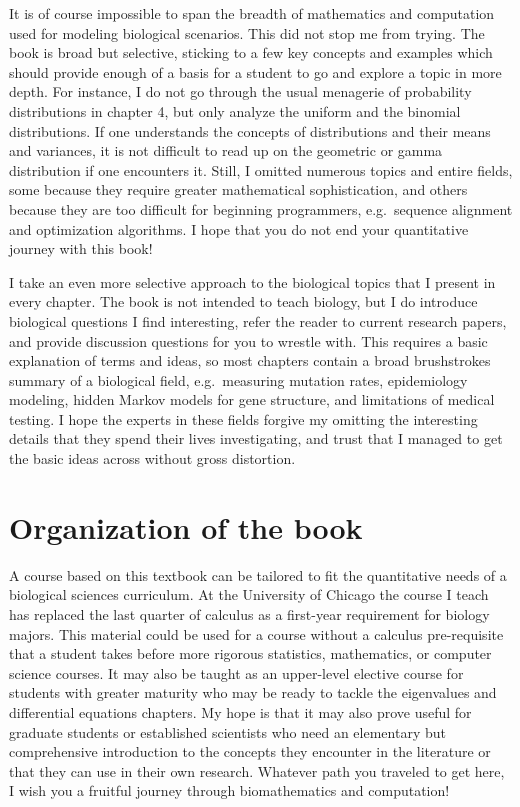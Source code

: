 \documentclass[
  letterpaper,
  DIV=11,
  numbers=noendperiod]{scrreprt}
\begin{document}
It is of course impossible to span the breadth of mathematics and
computation used for modeling biological scenarios. This did not stop me
from trying. The book is broad but selective, sticking to a few key
concepts and examples which should provide enough of a basis for a
student to go and explore a topic in more depth. For instance, I do not
go through the usual menagerie of probability distributions in chapter
4, but only analyze the uniform and the binomial distributions. If one
understands the concepts of distributions and their means and variances,
it is not difficult to read up on the geometric or gamma distribution if
one encounters it. Still, I omitted numerous topics and entire fields,
some because they require greater mathematical sophistication, and
others because they are too difficult for beginning programmers,
e.g.~sequence alignment and optimization algorithms. I hope that you do
not end your quantitative journey with this book!

I take an even more selective approach to the biological topics that I
present in every chapter. The book is not intended to teach biology, but
I do introduce biological questions I find interesting, refer the reader
to current research papers, and provide discussion questions for you to
wrestle with. This requires a basic explanation of terms and ideas, so
most chapters contain a broad brushstrokes summary of a biological
field, e.g.~measuring mutation rates, epidemiology modeling, hidden
Markov models for gene structure, and limitations of medical testing. I
hope the experts in these fields forgive my omitting the interesting
details that they spend their lives investigating, and trust that I
managed to get the basic ideas across without gross distortion.

\hypertarget{organization-of-the-book}{%
\section*{Organization of the book}\label{organization-of-the-book}}


A course based on this textbook can be tailored to fit the quantitative
needs of a biological sciences curriculum. At the University of Chicago
the course I teach has replaced the last quarter of calculus as a
first-year requirement for biology majors. This material could be used
for a course without a calculus pre-requisite that a student takes
before more rigorous statistics, mathematics, or computer science
courses. It may also be taught as an upper-level elective course for
students with greater maturity who may be ready to tackle the
eigenvalues and differential equations chapters. My hope is that it may
also prove useful for graduate students or established scientists who
need an elementary but comprehensive introduction to the concepts they
encounter in the literature or that they can use in their own research.
Whatever path you traveled to get here, I wish you a fruitful journey
through biomathematics and computation!
\end{document}
